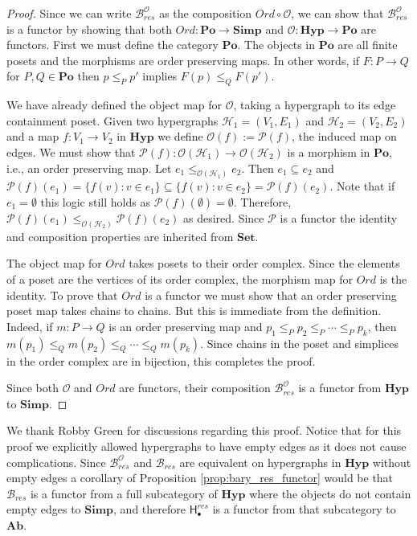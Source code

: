 \documentclass{amsart}
\newcommand{\Set}{\mathrm{\textbf{Set}}}
\newcommand{\Simp}{\mathrm{\textbf{Simp}}}
\newcommand{\Ab}{\mathrm{\textbf{Ab}}}
\newcommand{\Po}{\mathrm{\textbf{Po}}}
\newcommand{\Hyp}{\mathrm{\textbf{Hyp}}}
\newcommand{\Hgroup}	     {\mathsf{H}}
\renewcommand{\hom}[2]{\Hgroup_{#2}^{#1}}
\renewcommand{\H}{\mathcal{H}}
\newcommand{\bary}{\mathcal{B}}
\newcommand{\po}{\mathcal{P}}
\newcommand{\ECP}{\mathcal{O}}
\newcommand{\Ord}{Ord}
\begin{document}
\begin{proof}
Since we can write $\bary_{res}^\ECP$ as the composition $\Ord \circ \ECP$, we can show that $\bary_{res}^\ECP$ is a functor by showing that both $\Ord : \Po \rightarrow \Simp$ and $\ECP : \Hyp \rightarrow \Po$ are functors.
First we must define the category $\Po$. The objects in $\Po$ are all finite posets and the morphisms are order preserving maps. In other words, if $F : P \rightarrow Q$ for $P, Q \in \Po$ then $p \leq_P p'$ implies $F(p) \leq_Q F(p')$. 

We have already defined the object map for $\ECP$, taking a hypergraph to its edge containment poset. Given two hypergraphs $\H_1=(V_1, E_1)$ and $\H_2=(V_2, E_2)$ and a map $f : V_1 \rightarrow V_2$ in $\Hyp$ we define $\ECP(f) := \po(f)$, the induced map on edges. 
We must show that $\po(f) : \ECP(\H_1) \rightarrow \ECP(\H_2)$ is a morphism in $\Po$, i.e., an order preserving map. 
Let $e_1 \leq_{\ECP(\H_1)} e_2$. Then $e_1 \subseteq e_2$ and $\po(f)(e_1) = \{f(v) : v \in e_1\} \subseteq \{f(v) : v \in e_2 \} = \po(f)(e_2)$.
Note that if $e_1 = \emptyset$ this logic still holds as $\po(f)(\emptyset) = \emptyset$.
Therefore, $\po(f)(e_1) \leq_{\ECP(\H_2)} \po(f)(e_2)$ as desired. Since $\po$ is a functor the identity and composition properties are inherited from $\Set$.

The object map for $\Ord$ takes posets to their order complex. Since the elements of a poset are the vertices of its order complex, the morphism map for $\Ord$ is the identity. To prove that $\Ord$ is a functor we must show that an order preserving poset map takes chains to chains. But this is immediate from the definition. Indeed, if $m : P \rightarrow Q$ is an order preserving map and $p_1 \leq_P p_2 \leq_P \cdots \leq_P p_k$, then $m(p_1) \leq_Q m(p_2) \leq_Q \cdots \leq_Q m(p_k)$. Since chains in the poset and simplices in the order complex are in bijection, this completes the proof.

Since both $\ECP$ and $\Ord$ are functors, their composition $\bary_{res}^\ECP$ is a functor from $\Hyp$ to $\Simp$.
\end{proof}

We thank Robby Green for discussions regarding this proof. Notice that for this proof we explicitly allowed hypergraphs to have empty edges as it does not cause complications. Since $\bary_{res}^\ECP$ and $\bary_{res}$ are equivalent on hypergraphs in $\Hyp$ without empty edges a corollary of Proposition \ref{prop:bary_res_functor} would be that $\bary_{res}$ is a functor from a full subcategory of $\Hyp$ where the objects do not contain empty edges to $\Simp$, and therefore $\hom{res}{\bullet}$ is a functor from that subcategory to $\Ab$.
\end{document}
